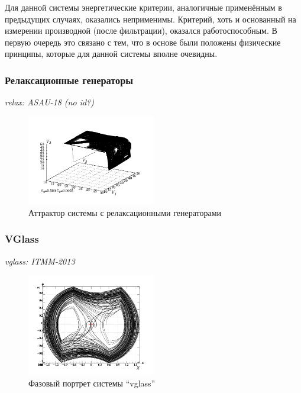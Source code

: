 \documentclass[a4paper,12pt]{article}
\newcommand{\LinkRef}[1]{ \textit{\color{red}#1} }
\begin{document}
Для данной системы энергетические критерии, аналогичные применённым в предыдущих случаях,
оказались неприменимы. Критерий, хоть и основанный на измерении производной (после фильтрации),
оказался работоспособным. В первую очередь это связано с тем, что в основе были положены
физические принципы, которые для данной системы вполне очевидны.





\FloatBarrier
\subsubsection{Релаксационные генераторы}


\LinkRef{
  relax: ASAU-18 (no id?)
}

\begin{figure}[htb!]
\centerline{\includegraphics[width=0.5\textwidth]{p/cha/relax_phase3_0500.pdf} }
\caption{Аттрактор системы с релаксационными генераторами}
\label{atu:f:relax_phase3}
\end{figure}



\FloatBarrier
\subsubsection{VGlass} %

\LinkRef{
  vglass: ITMM-2013
}

\begin{figure}[htb!]
\centerline{\includegraphics[width=0.5\textwidth]{p/cha/vg1-graph_phase.png} }
\caption{Фазовый портрет системы ``vglass'' }
\label{atu:f:vglass_phase}
\end{figure}
\end{document}

